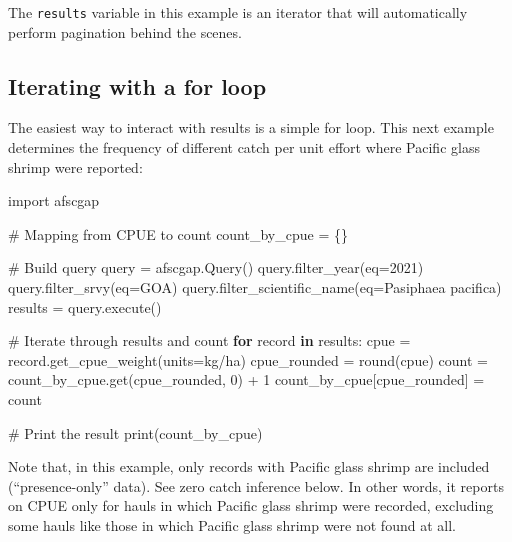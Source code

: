 \documentclass[
  letterpaper,
  oneside,
  open=any]{scrbook}
\newenvironment{Shaded}{\begin{snugshade}}{\end{snugshade}}
\newcommand{\AttributeTok}[1]{\textcolor[rgb]{0.40,0.45,0.13}{#1}}
\newcommand{\CommentTok}[1]{\textcolor[rgb]{0.37,0.37,0.37}{#1}}
\newcommand{\ControlFlowTok}[1]{\textcolor[rgb]{0.00,0.23,0.31}{\textbf{#1}}}
\newcommand{\DecValTok}[1]{\textcolor[rgb]{0.68,0.00,0.00}{#1}}
\newcommand{\FunctionTok}[1]{\textcolor[rgb]{0.28,0.35,0.67}{#1}}
\newcommand{\NormalTok}[1]{\textcolor[rgb]{0.00,0.23,0.31}{#1}}
\newcommand{\OtherTok}[1]{\textcolor[rgb]{0.00,0.23,0.31}{#1}}
\newcommand{\SpecialCharTok}[1]{\textcolor[rgb]{0.37,0.37,0.37}{#1}}
\newcommand{\StringTok}[1]{\textcolor[rgb]{0.13,0.47,0.30}{#1}}
\begin{document}
The \texttt{results} variable in this example is an iterator that will
automatically perform pagination behind the scenes.

\subsection{Iterating with a for loop}\label{iterating-with-a-for-loop}

The easiest way to interact with results is a simple for loop. This next
example determines the frequency of different catch per unit effort
where Pacific glass shrimp were reported:

\begin{Shaded}
\begin{Highlighting}[]
\NormalTok{import afscgap}

\CommentTok{\# Mapping from CPUE to count}
\NormalTok{count\_by\_cpue }\OtherTok{=}\NormalTok{ \{\}}

\CommentTok{\# Build query}
\NormalTok{query }\OtherTok{=} \FunctionTok{afscgap.Query}\NormalTok{()}
\FunctionTok{query.filter\_year}\NormalTok{(}\AttributeTok{eq=}\DecValTok{2021}\NormalTok{)}
\FunctionTok{query.filter\_srvy}\NormalTok{(}\AttributeTok{eq=}\StringTok{\textquotesingle{}GOA\textquotesingle{}}\NormalTok{)}
\FunctionTok{query.filter\_scientific\_name}\NormalTok{(}\AttributeTok{eq=}\StringTok{\textquotesingle{}Pasiphaea pacifica\textquotesingle{}}\NormalTok{)}
\NormalTok{results }\OtherTok{=} \FunctionTok{query.execute}\NormalTok{()}

\CommentTok{\# Iterate through results and count}
\ControlFlowTok{for}\NormalTok{ record }\ControlFlowTok{in}\NormalTok{ results}\SpecialCharTok{:}
\NormalTok{  cpue }\OtherTok{=} \FunctionTok{record.get\_cpue\_weight}\NormalTok{(}\AttributeTok{units=}\StringTok{\textquotesingle{}kg/ha\textquotesingle{}}\NormalTok{)}
\NormalTok{  cpue\_rounded }\OtherTok{=} \FunctionTok{round}\NormalTok{(cpue)}
\NormalTok{  count }\OtherTok{=} \FunctionTok{count\_by\_cpue.get}\NormalTok{(cpue\_rounded, }\DecValTok{0}\NormalTok{) }\SpecialCharTok{+} \DecValTok{1}
\NormalTok{  count\_by\_cpue[cpue\_rounded] }\OtherTok{=}\NormalTok{ count}

\CommentTok{\# Print the result}
\FunctionTok{print}\NormalTok{(count\_by\_cpue)}
\end{Highlighting}
\end{Shaded}

Note that, in this example, only records with Pacific glass shrimp are
included (``presence-only'' data). See zero catch inference below. In
other words, it reports on CPUE only for hauls in which Pacific glass
shrimp were recorded, excluding some hauls like those in which Pacific
glass shrimp were not found at all.
\end{document}
